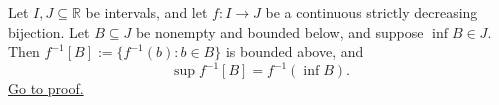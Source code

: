 \begin{theorem}
\label{thm:decreasing-inverse-infimum-to-supremum}
Let $I,J\subseteq\mathbb{R}$ be intervals, and let $f\colon I\to J$ be a continuous
strictly decreasing bijection.  Let $B\subseteq J$ be nonempty and bounded
below, and suppose $\inf B\in J$.  Then
$f^{-1}[B]:=\{f^{-1}(b):b\in B\}$ is bounded above, and
\[
  \sup f^{-1}[B]=f^{-1}(\inf B).
\]
\hyperref[prf:decreasing-inverse-infimum-to-supremum]{Go to proof.}
\end{theorem}